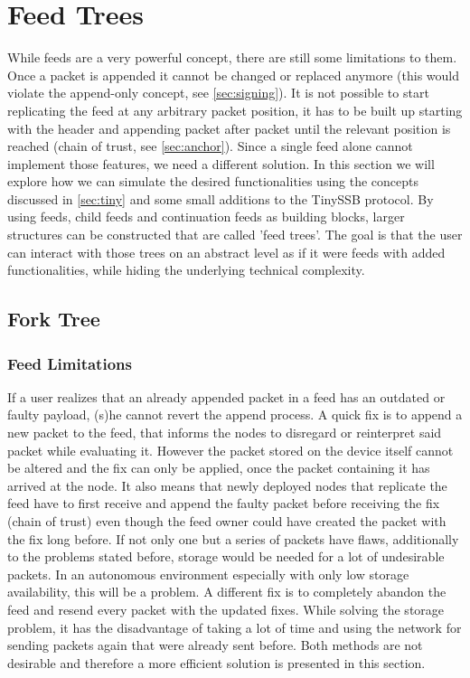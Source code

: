 \chapter{Feed Trees}

While feeds are a very powerful concept, there are still some limitations to them. Once a packet is appended it cannot be changed or replaced anymore (this would violate the append-only concept, see \cref{sec:signing}). It is not possible to start replicating the feed at any arbitrary packet position, it has to be built up starting with the header and appending packet after packet until the relevant position is reached (chain of trust, see \cref{sec:anchor}). Since a single feed alone cannot implement those features, we need a different solution. In this section we will explore how we can simulate the desired functionalities using the concepts discussed in \cref{sec:tiny} and some small additions to the TinySSB protocol. By using feeds, child feeds and continuation feeds as building blocks, larger structures can be constructed that are called 'feed trees'. The goal is that the user can interact with those trees on an abstract level as if it were feeds with added functionalities, while hiding the underlying technical complexity.

\section{Fork Tree}
\subsection{Feed Limitations}
If a user realizes that an already appended packet in a feed has an outdated or faulty payload, (s)he cannot revert the append process. A quick fix is to append a new packet to the feed, that informs the nodes to disregard or reinterpret said packet while evaluating it. However the packet stored on the device itself cannot be altered and the fix can only be applied, once the packet containing it has arrived at the node. It also means that newly deployed nodes that replicate the feed have to first receive and append the faulty packet before receiving the fix (chain of trust) even though the feed owner could have created the packet with the fix long before. If not only one but a series of packets have flaws, additionally to the problems stated before, storage would be needed for a lot of undesirable packets. In an autonomous environment especially with only low storage availability, this will be a problem. A different fix is to completely abandon the feed and resend every packet with the updated fixes. While solving the storage problem, it has the disadvantage of taking a lot of time and using the network for sending packets again that were already sent before. Both methods are not desirable and therefore a more efficient solution is presented in this section. 

